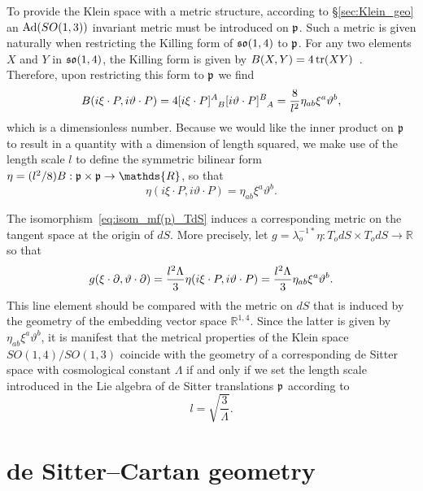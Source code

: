 \documentclass[
final,
11pt,
a4paper,
DIV=11,
headinclude=true,
footinclude=false,
bibliography=totoc,
twoside=true,  %
BCOR=5mm
]{scrbook}
\begin{document}
To provide the Klein space with a metric structure, according to 
\S\ref{sec:Klein_geo} an $\operatorname{Ad}(SO(1,3))$ invariant metric must be 
introduced on $\mathfrak{p}$. Such a metric is given naturally when 
restricting the Killing form of $\mathfrak{so}(1,4)$ to $\mathfrak{p}$.
For any two elements $X$ and $Y$ in $\mathfrak{so}(1,4)$, the Killing 
form is given by $B(X,Y) = 4 \operatorname{tr} (XY)$~\cite{helgasson:1978dg}.  
Therefore, upon restricting this form to $\mathfrak{p}$ we find
\begin{equation*}
  B(i \xi \cdot P, i\vartheta \cdot P)
  = 4[i \xi \cdot P]\ind{^A_B} [i \vartheta \cdot P]\ind{^B_A}
  = \frac{8}{l^2} \eta_{ab} \xi^a \vartheta^b,
\end{equation*}
which is a dimensionless number. Because we would like the inner 
product on $\mathfrak{p}$ to result in a quantity with a dimension of 
length squared, we make use of the length scale $l$ to define the 
symmetric bilinear form $\eta = (l^2/8) B : \mf{p} \times \mf{p} 
\to \mathds{R}$, so that
\begin{equation*}
  \eta(i\xi \cdot P, i\vartheta \cdot P) = \eta_{ab} \xi^a 
  \vartheta^b.
\end{equation*}

The isomorphism~\eqref{eq:isom_mf(p)_TdS} induces a corresponding 
metric on the tangent space at the origin of $dS$.  More 
precisely,  let $g = \lambda_o^{-1*}\eta : T_o dS \times T_o dS 
\to \mathds{R}$ so that
\begin{equation*}
  g(\xi \cdot \partial,\vartheta \cdot \partial)
  = \frac{l^2\Lambda}{3} \eta (i\xi \cdot P, i\vartheta \cdot P) 
  = \frac{l^2\Lambda}{3} \eta_{ab} \xi^a \vartheta^b.
\end{equation*}
This line element should be compared with the metric on $dS$ that 
is induced by the geometry of the embedding vector space 
$\mathds{R}^{1,4}$.  Since the latter is given by 
$\eta_{ab}\xi^a\vartheta^b$, it is manifest that the metrical 
properties of the Klein space $SO(1,4)/SO(1,3)$ coincide with the 
geometry of a corresponding de Sitter space with cosmological 
constant $\Lambda$ if and only if we set the length scale 
introduced in the Lie algebra of de Sitter translations $\mathfrak{p}$ 
according to~\cite{Wise:2010sm}
\begin{equation}
\label{eq:rel_l_Lambda}
  l = \sqrt{\frac{3}{\Lambda}}.
\end{equation}

\section{de Sitter--Cartan geometry}
\label{sec:dSCgeometry}
\end{document}
